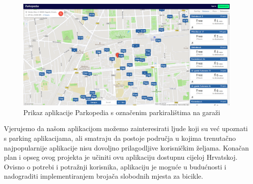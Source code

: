 		\begin{figure}[H]
			\includegraphics[width=\textwidth]{slike/parkopedia_garage.PNG}
			\caption{Prikaz aplikacije Parkopedia s označenim parkiralištima na garaži}
			\label{fig:promjene5} 
		\end{figure}
		
		Vjerujemo da našom aplikacijom možemo zainteresirati ljude koji su već upoznati s parking aplikacijama, ali smatraju da postoje područja u kojima trenutačno najpopularnije aplikacije nisu dovoljno prilagodljive korisničkim željama. Konačan plan i opseg ovog projekta je učiniti ovu aplikaciju dostupnu cijeloj Hrvatskoj. Ovisno o potrebi i potražnji korisnika, aplikaciju je moguće u budućnosti i nadograditi implementiranjem brojača slobodnih mjesta za bicikle.

		


		
		
	